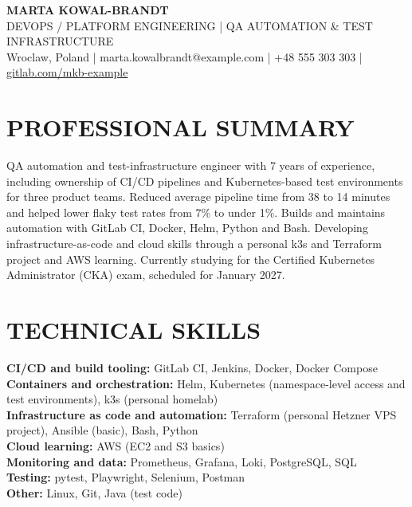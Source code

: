 \documentclass[11pt,a4paper]{article}
\begin{document}
\begin{center}
{\Huge\bfseries\color{primarycolor} MARTA KOWAL-BRANDT}\\[0.35em]
{\large\color{accentcolor} DEVOPS / PLATFORM ENGINEERING | QA AUTOMATION \& TEST INFRASTRUCTURE}\\[0.25em]
Wroclaw, Poland | marta.kowalbrandt@example.com | +48 555 303 303 | \url{gitlab.com/mkb-example}
\end{center}

\section*{PROFESSIONAL SUMMARY}
QA automation and test-infrastructure engineer with 7 years of experience, including ownership of CI/CD pipelines and Kubernetes-based test environments for three product teams. Reduced average pipeline time from 38 to 14 minutes and helped lower flaky test rates from 7\% to under 1\%. Builds and maintains automation with GitLab CI, Docker, Helm, Python and Bash. Developing infrastructure-as-code and cloud skills through a personal k3s and Terraform project and AWS learning. Currently studying for the Certified Kubernetes Administrator (CKA) exam, scheduled for January 2027.

\section*{TECHNICAL SKILLS}
\textbf{CI/CD and build tooling:} GitLab CI, Jenkins, Docker, Docker Compose\\
\textbf{Containers and orchestration:} Helm, Kubernetes (namespace-level access and test environments), k3s (personal homelab)\\
\textbf{Infrastructure as code and automation:} Terraform (personal Hetzner VPS project), Ansible (basic), Bash, Python\\
\textbf{Cloud learning:} AWS (EC2 and S3 basics)\\
\textbf{Monitoring and data:} Prometheus, Grafana, Loki, PostgreSQL, SQL\\
\textbf{Testing:} pytest, Playwright, Selenium, Postman\\
\textbf{Other:} Linux, Git, Java (test code)
\end{document}
